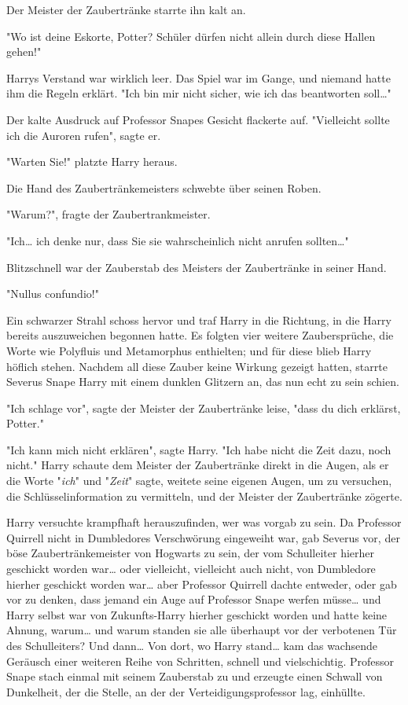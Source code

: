 {Der Meister der Zaubertränke starrte ihn kalt an.

"Wo ist deine Eskorte, Potter? Schüler dürfen nicht allein durch diese Hallen gehen!"

Harrys Verstand war wirklich leer. Das Spiel war im Gange, und niemand hatte ihm die Regeln erklärt. "Ich bin mir nicht sicher, wie ich das beantworten soll…"

Der kalte Ausdruck auf Professor Snapes Gesicht flackerte auf. "Vielleicht sollte ich die Auroren rufen", sagte er.

"Warten Sie!" platzte Harry heraus.

Die Hand des Zaubertränkemeisters schwebte über seinen Roben.

"Warum?", fragte der Zaubertrankmeister.

"Ich… ich denke nur, dass Sie sie wahrscheinlich nicht anrufen sollten…"

Blitzschnell war der Zauberstab des Meisters der Zaubertränke in seiner Hand.

"Nullus confundio!"

Ein schwarzer Strahl schoss hervor und traf Harry in die Richtung, in die Harry bereits auszuweichen begonnen hatte. Es folgten vier weitere Zaubersprüche, die Worte wie Polyfluis und Metamorphus enthielten; und für diese blieb Harry höflich stehen. Nachdem all diese Zauber keine Wirkung gezeigt hatten, starrte Severus Snape Harry mit einem dunklen Glitzern an, das nun echt zu sein schien.

"Ich schlage vor", sagte der Meister der Zaubertränke leise, "dass du dich erklärst, Potter."

"Ich kann mich nicht erklären", sagte Harry. "Ich habe nicht die Zeit dazu, noch nicht." Harry schaute dem Meister der Zaubertränke direkt in die Augen, als er die Worte "\emph{ich}" und "\emph{Zeit}" sagte, weitete seine eigenen Augen, um zu versuchen, die Schlüsselinformation zu vermitteln, und der Meister der Zaubertränke zögerte.

Harry versuchte krampfhaft herauszufinden, wer was vorgab zu sein. Da Professor Quirrell nicht in Dumbledores Verschwörung eingeweiht war, gab Severus vor, der böse Zaubertränkemeister von Hogwarts zu sein, der vom Schulleiter hierher geschickt worden war… oder vielleicht, vielleicht auch nicht, von Dumbledore hierher geschickt worden war… aber Professor Quirrell dachte entweder, oder gab vor zu denken, dass jemand ein Auge auf Professor Snape werfen müsse… und Harry selbst war von Zukunfts-Harry hierher geschickt worden und hatte keine Ahnung, warum… und warum standen sie alle überhaupt vor der verbotenen Tür des Schulleiters? Und dann… Von dort, wo Harry stand… kam das wachsende Geräusch einer weiteren Reihe von Schritten, schnell und vielschichtig. Professor Snape stach einmal mit seinem Zauberstab zu und erzeugte einen Schwall von Dunkelheit, der die Stelle, an der der Verteidigungsprofessor lag, einhüllte.

}

